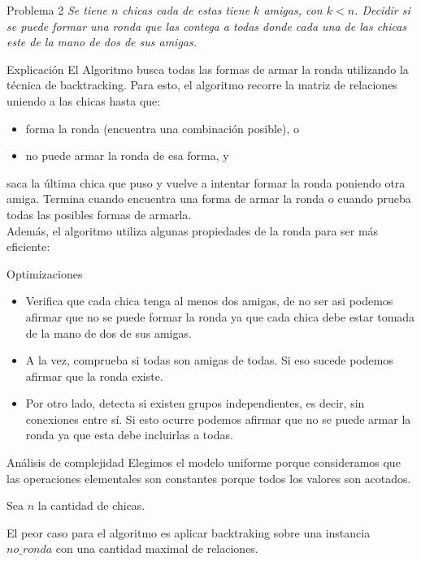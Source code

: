 \begin{section}{Problema 2}
	\textit{Se tiene $n$ chicas cada de estas tiene $k$ amigas, con $k<n$. Decidir si se puede formar una ronda que las contega a todas donde cada una de las chicas este de la mano de dos de sus amigas.}
	\begin{subsection}{Explicación}
		El Algoritmo busca todas las formas de armar la ronda utilizando la técnica de backtracking. Para esto, el algoritmo recorre la matriz de relaciones uniendo a las chicas hasta que:
		\begin{itemize} \item forma la ronda (encuentra una combinación posible), o \item no puede armar la ronda de esa forma, y\end{itemize}
		
				saca la última chica que puso y vuelve a intentar formar la ronda poniendo otra amiga. Termina cuando encuentra una forma de armar la ronda o cuando prueba todas las posibles formas de armarla.\\
			
		Además, el algoritmo utiliza algunas propiedades de la ronda para ser más eficiente:
		\begin{subsubsection}{Optimizaciones}
		\begin{itemize} \item Verifica que cada chica tenga al menos dos amigas, de no ser asi podemos afirmar que no se puede formar la ronda ya que cada chica debe estar tomada de la mano de dos de sus amigas.
				\item A la vez, comprueba si todas son amigas de todas. Si eso sucede podemos afirmar que la ronda existe.
				\item Por otro lado, detecta si existen grupos independientes, es decir, sin conexiones entre sí. Si esto ocurre podemos afirmar que no se puede armar la ronda ya que esta debe incluirlas a todas. 
		\end{itemize}
			
		\end{subsubsection}
			
		\begin{subsubsection}{Análisis de complejidad}
			Elegimos el modelo uniforme porque consideramos que las operaciones elementales son constantes porque todos los valores son acotados.\Pa
		
			Sea $n$ la cantidad de chicas.	
		
			El peor caso para el algoritmo es aplicar backtraking sobre una instancia $no\_ronda$ con una cantidad maximal de relaciones.
			

\end{subsubsection}
\end{subsection}
\end{section}
